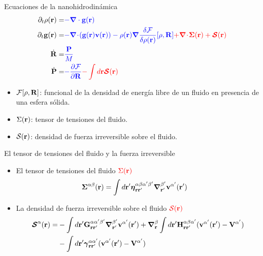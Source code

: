 \documentclass{beamer}
\newcommand{\esc}{\!\cdot\!}
\begin{document}
\begin{frame}{Ecuaciones de la nanohidrodinámica}
\begin{align}
  \partial_t\rho({\bf r})=&{\color{blue} -\boldsymbol{\nabla}\cdot{\bf g}({\bf r})}
\nonumber\\
\partial_t{\bf g}({\bf r})=&{\color{blue} -\boldsymbol{\nabla}\esc{\left({\bf g}({\bf r}){\bf v}({\bf r})\right)}
-\rho({\bf r})\boldsymbol{\nabla}\frac{\delta {\cal F}}{\delta\rho({\bf r})}[\rho,{\bf R}]}
{\color{red} +\boldsymbol{\nabla}\esc\boldsymbol{\Sigma}({\bf r})+\boldsymbol{{\cal S}}({\bf r})}
\nonumber\\
\dot{\bf R}=&{\color{blue} \frac{\bf P}{M}}
\nonumber\\
\dot{\bf P}=&{\color{blue} -\frac{\partial {\cal F}}{\partial {\bf R}}}
{\color{red} -\int d {{\bf r}}\boldsymbol{{\cal S}}({\bf r})}
\nonumber
\end{align}

\begin{itemize}
  \item ${\cal F}[\rho, {\bf R}]$: funcional de la densidad de energía libre de un fluido en presencia de una esfera sólida. 
  \item $\Sigma({\bf r})$: tensor de tensiones del fluido. 
  \item ${\cal S}({\bf r})$: densidad de fuerza irreversible sobre el fluido. 
\end{itemize}
\end{frame}

\begin{frame}{El tensor de tensiones del fluido y la fuerza irreversible}
  \begin{itemize}
    \item<1-> El tensor de tensiones del fluido ${\color{red} \Sigma({\bf r})}$ 
  \begin{align}
  \boldsymbol{\Sigma}^{\alpha\beta}({\bf r})&=
\int d{\bf r}'
\boldsymbol{\eta}^{\alpha\beta\alpha'\beta'}_{{\bf r}{\bf r}'}
\boldsymbol{\nabla}_{{\bf r}'}^{\beta'}{\bf v}^{\alpha'}({\bf r}')
\nonumber
\end{align}
\item<2-> La densidad de fuerza irreversible sobre el fluido ${\color{red} {\cal S}({\bf r})}$
\begin{align}
  \boldsymbol{{\cal S}}^\alpha({\bf r})=&
-\int d{\bf r}'{\bf G}^{\alpha\alpha'\beta'}_{{\bf r}{\bf r}'}
\boldsymbol{\nabla}_{{\bf r}'}^{\beta'} {\bf v}^{\alpha'}({\bf r}')
+\boldsymbol{\nabla}_{{\bf r}}^{\beta}\int d{\bf r}'{\bf H}^{\alpha\beta\alpha'}_{{\bf r}{\bf r}'}
( {\bf v}^{\alpha'}({\bf r}')-{\bf V}^{\alpha'})
\nonumber\\
&-\int d{\bf r}'
\boldsymbol{\gamma}^{\alpha\alpha'}_{{\bf r}{\bf r}'}( {\bf v}^{\alpha'}({\bf r}')
-{\bf V}^{\alpha'})
\nonumber
\end{align}
\end{itemize}
\end{frame}
\end{document}
